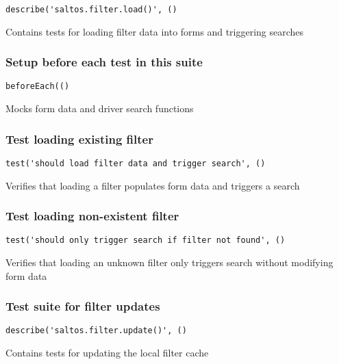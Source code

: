 \documentclass[a4paper]{article}
\begin{document}
\begin{lstlisting}
describe('saltos.filter.load()', ()
\end{lstlisting}

Contains tests for loading filter data into forms and triggering searches

\hypertarget{toc590}{}
\subsubsection{Setup before each test in this suite}

\begin{lstlisting}
beforeEach(()
\end{lstlisting}

Mocks form data and driver search functions

\hypertarget{toc591}{}
\subsubsection{Test loading existing filter}

\begin{lstlisting}
test('should load filter data and trigger search', ()
\end{lstlisting}

Verifies that loading a filter populates form data
and triggers a search

\hypertarget{toc592}{}
\subsubsection{Test loading non-existent filter}

\begin{lstlisting}
test('should only trigger search if filter not found', ()
\end{lstlisting}

Verifies that loading an unknown filter only triggers search
without modifying form data

\hypertarget{toc593}{}
\subsubsection{Test suite for filter updates}

\begin{lstlisting}
describe('saltos.filter.update()', ()
\end{lstlisting}

Contains tests for updating the local filter cache
\end{document}
